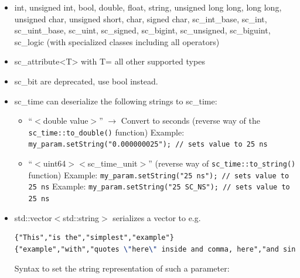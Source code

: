 \begin{itemize}
	\item {\sffamily int}, {\sffamily unsigned int}, {\sffamily bool}, {\sffamily double}, {\sffamily float},
		{\sffamily string}, {\sffamily unsigned long long}, {\sffamily long long}, {\sffamily unsigned char}, {\sffamily unsigned short}, {\sffamily char}, {\sffamily signed char},
		{\sffamily sc\_int\_base}, {\sffamily sc\_int}, {\sffamily sc\_uint\_base}, {\sffamily sc\_uint},
		{\sffamily sc\_signed}, {\sffamily sc\_bigint}, {\sffamily sc\_unsigned}, {\sffamily sc\_biguint},
		{\sffamily sc\_logic} \newline
		(with specialized classes including all operators)
	\item {\sffamily sc\_attribute\textless T\textgreater} with T= all other supported types
    \item {\sffamily sc\_bit} are deprecated, use bool instead.
    \item {\sffamily sc\_time} can deserialize the following strings to sc\_time:
	\begin{itemize}
		\item ``$<$double value$>$'' $\rightarrow$ Convert to seconds \newline
		(reverse way of the \lstinline|sc_time::to_double()| function) \newline
          Example: \lstinline|my_param.setString("0.000000025"); // sets value to 25 ns |
		\item ``$<$uint64$> <$sc\_time\_unit$>$'' (reverse way of \lstinline|sc_time::to_string()| function) \newline
          Example: \lstinline|my_param.setString("25 ns"); // sets value to 25 ns| \newline
          Example: \lstinline|my_param.setString("25 SC_NS"); // sets value to 25 ns|
	\end{itemize}
	\item {\sffamily std::vector$<$std::string$>$} serializes a vector to e.g.
		\begin{lstlisting}[language=TeX]
{"This","is the","simplest","example"}
{"example","with","quotes \"here\" inside and comma, here","and single quote 'here"}
		\end{lstlisting}
		Syntax to set the string representation of such a parameter:


\end{itemize}
